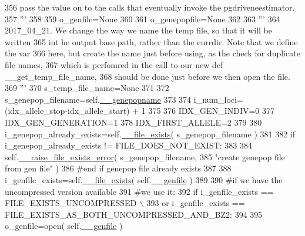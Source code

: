 \begin{DoxyCode}
356 \textcolor{stringliteral}{        pass the value on to the calls that eventually invoke the pgdriveneestimator.}
357 \textcolor{stringliteral}{        '''}
358 
359         o\_genfile=\textcolor{keywordtype}{None}
360 
361         o\_genepopfile=\textcolor{keywordtype}{None}
362     
363         \textcolor{stringliteral}{'''}
364 \textcolor{stringliteral}{        2017\_04\_21.  We change the way we name the temp file, so that it will be written}
365 \textcolor{stringliteral}{        int he output base path, rather than the currdir. Note that we define the var}
366 \textcolor{stringliteral}{        here, but create the name just before using, as the check for duplicate file names,}
367 \textcolor{stringliteral}{        which is perfomred in the call to our new def \_\_get\_temp\_file\_name, }
368 \textcolor{stringliteral}{        should be done just before we then open the file.}
369 \textcolor{stringliteral}{        '''}
370         s\_temp\_file\_name=\textcolor{keywordtype}{None}
371     
372         s\_genepop\_filename=self.\hyperlink{classnegui_1_1pgoutputsimupop_1_1PGOutputSimuPop_a05d91a106b2529b6cbae7777717a03b6}{\_\_genepopname}  
373 
374         i\_num\_loci=(idx\_allele\_stop-idx\_allele\_start) + 1
375 
376         IDX\_GEN\_INDIV=0
377         IDX\_GEN\_GENERATION=1
378         IDX\_FIRST\_ALLELE=2
379 
380         i\_genepop\_already\_exists=self.\hyperlink{classnegui_1_1pgoutputsimupop_1_1PGOutputSimuPop_a1fdfb988619bd4a9d377a1e20f52839c}{\_\_file\_exists}( s\_genepop\_filename )
381 
382         \textcolor{keywordflow}{if} i\_genepop\_already\_exists != FILE\_DOES\_NOT\_EXIST:
383 
384             self.\hyperlink{classnegui_1_1pgoutputsimupop_1_1PGOutputSimuPop_ad3f4c271b5b800d0137460e2349452e0}{\_\_raise\_file\_exists\_error}( s\_genepop\_filename, 
385                     \textcolor{stringliteral}{"create genepop file from gen file"} )
386         \textcolor{comment}{#end if genepop file already exists}
387 
388         i\_genfile\_exists=self.\hyperlink{classnegui_1_1pgoutputsimupop_1_1PGOutputSimuPop_a1fdfb988619bd4a9d377a1e20f52839c}{\_\_file\_exists}( self.\hyperlink{classnegui_1_1pgoutputsimupop_1_1PGOutputSimuPop_a30fb6b94af13efad6becfbe6fddc1d95}{\_\_genfile} )
389         
390         \textcolor{comment}{#if we have the uncompressed version available}
391         \textcolor{comment}{#we use it:}
392         \textcolor{keywordflow}{if} i\_genfile\_exists == FILE\_EXISTS\_UNCOMPRESSED \(\backslash\)
393             \textcolor{keywordflow}{or} i\_genfile\_exists == FILE\_EXISTS\_AS\_BOTH\_UNCOMPRESSED\_AND\_BZ2:
394 
395             o\_genfile=open( self.\hyperlink{classnegui_1_1pgoutputsimupop_1_1PGOutputSimuPop_a30fb6b94af13efad6becfbe6fddc1d95}{\_\_genfile} )

\end{DoxyCode}
